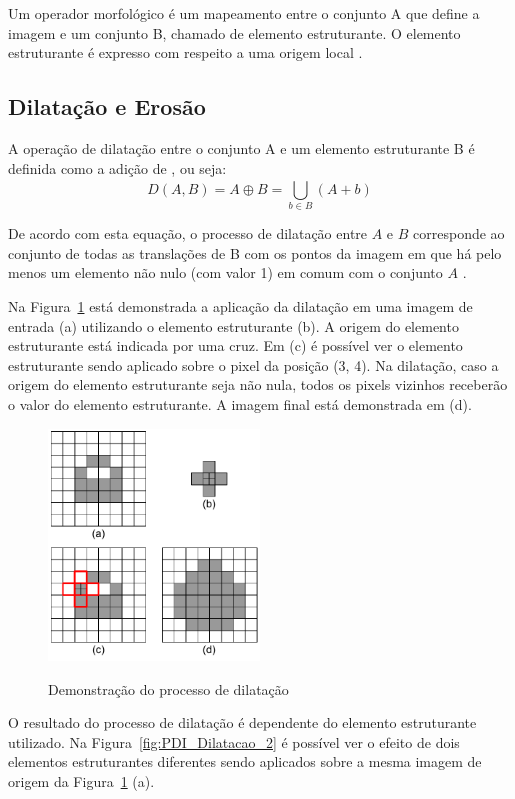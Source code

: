 \documentclass[12pt,oneside,a4paper,english,french,spanish,brazil,]{abntex2}
\begin{document}
Um operador morfológico é um mapeamento entre o conjunto A que define a imagem e um conjunto B, chamado de elemento estruturante. O elemento estruturante é expresso com respeito a uma origem local \cite{pedrini:2008}.

\subsection{Dilatação e Erosão}

A operação de dilatação entre o conjunto A e um elemento estruturante B é definida como a adição de \citet{minkowski:1911}, ou seja: \[D(A,B)=A\oplus B=\bigcup_{b\in B}^{ } (A+b)\]

De acordo com esta equação, o processo de dilatação entre \(A\) e \(B\) corresponde ao conjunto de todas as translações de B com os pontos da imagem em que há pelo menos um elemento não nulo (com valor 1) em comum com o conjunto \(A\) \cite{pedrini:2008}. 

Na Figura~\ref{fig:PDI_Dilatacao_1} está demonstrada a aplicação da dilatação em uma imagem de entrada (a) utilizando o elemento estruturante (b). A origem do elemento estruturante está indicada por uma cruz. Em (c) é possível ver o elemento estruturante sendo aplicado sobre o pixel da posição (3, 4). Na dilatação, caso a origem do elemento estruturante seja não nula, todos os pixels vizinhos receberão o valor do elemento estruturante. A imagem final está demonstrada em (d).

\begin{figure}[ht]
\centering
\caption{Demonstração do processo de dilatação}
\includegraphics[width=0.5\textwidth]{imagens/PDI_Dilatacao_1.pdf}
\sourceAuthor
\label{fig:PDI_Dilatacao_1}
\end{figure}

O resultado do processo de dilatação é dependente do elemento estruturante utilizado. Na Figura~\ref{fig:PDI_Dilatacao_2} é possível ver o efeito de dois elementos estruturantes diferentes sendo aplicados sobre a mesma imagem de origem da Figura~\ref{fig:PDI_Dilatacao_1} (a).
\end{document}
